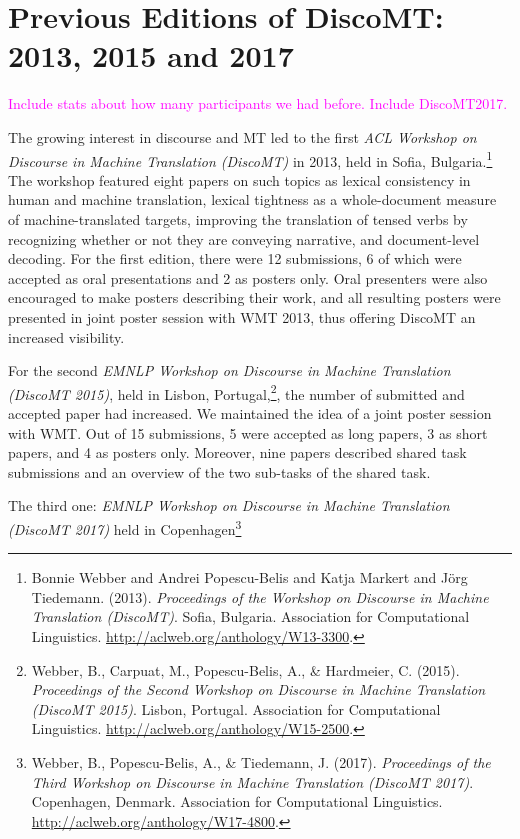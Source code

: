 \documentclass[11pt]{article}
\begin{document}
\section{Previous Editions of DiscoMT: 2013, 2015 and 2017}

\textcolor{magenta}{Include stats about how many participants we had before. Include DiscoMT2017.} 

The growing interest in discourse and MT led to the first
\textit{ACL Workshop on Discourse in Machine Translation (DiscoMT)} in 2013,
held in Sofia, Bulgaria.\footnote{Bonnie Webber  and  Andrei Popescu-Belis  and  Katja Markert  and  J\"{o}rg Tiedemann. (2013). \textit{Proceedings of the Workshop on Discourse in Machine Translation (DiscoMT)}. Sofia, Bulgaria. Association for Computational Linguistics. \url{http://aclweb.org/anthology/W13-3300}.}
The workshop
featured eight papers on such topics as lexical consistency in human and
machine translation, lexical tightness as a whole-document
measure of machine-translated targets, improving
the translation of tensed verbs by recognizing whether or not they are
conveying narrative, and document-level decoding.  For the first edition,
there were 12 submissions, 6 of which were accepted as oral presentations and
2 as posters only.  Oral presenters were also encouraged to make posters
describing their work, and all resulting posters were presented in joint
poster session with WMT 2013, thus offering DiscoMT an increased visibility.

 For the second
\textit{EMNLP Workshop on Discourse in Machine Translation (DiscoMT 2015)},
held in Lisbon, Portugal,\footnote{Webber, B., Carpuat, M., Popescu-Belis, A., \& Hardmeier, C. (2015). \textit{Proceedings of the Second Workshop on Discourse in Machine Translation (DiscoMT 2015)}. Lisbon, Portugal. Association for Computational Linguistics.  \url{http://aclweb.org/anthology/W15-2500}.}, the number of submitted and accepted paper had increased.  We maintained the idea of a joint poster session with WMT.  Out of 15 submissions,
5 were accepted as long papers, 3 as short papers, and 4 as posters only.  Moreover, nine papers described shared task submissions and an overview of the two sub-tasks of the shared task.


The third one: \textit{EMNLP Workshop on Discourse in Machine Translation (DiscoMT 2017)} held in Copenhagen\footnote{Webber, B., Popescu-Belis, A., \& Tiedemann, J. (2017). \textit{Proceedings of the Third Workshop on Discourse in Machine Translation (DiscoMT 2017)}. Copenhagen, Denmark. Association for Computational Linguistics.  \url{http://aclweb.org/anthology/W17-4800}.}
\end{document}
